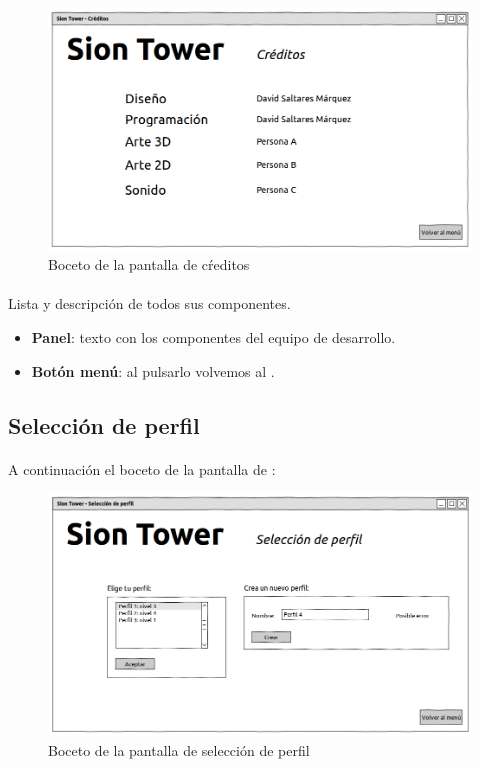 \begin{figure}[H]
    \centering
        \includegraphics[width=\textwidth]{img/creditos.png} 
    \caption{Boceto de la pantalla de cŕeditos}
    \label{img:creditos}
\end{figure}

\paragraph{}
Lista y descripción de todos sus componentes.

\begin{itemize}
    \item \textbf{Panel}: texto con los componentes del equipo de desarrollo.
    \item \textbf{Botón menú}: al pulsarlo volvemos al \menu.
\end{itemize}

\clearpage

\subsection{Selección de perfil}
\label{sec:ui-perfil}

\paragraph{}
A continuación el boceto de la pantalla de \selperfil:

\begin{figure}[H]
    \centering
        \includegraphics[width=\textwidth]{img/sel-perfil.png} 
    \caption{Boceto de la pantalla de selección de perfil}
    \label{img:sel-perfil}
\end{figure}

